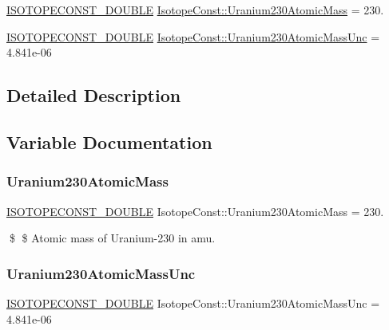 \begin{DoxyCompactItemize}
\item 
\mbox{\hyperlink{group___isotope_const-_macros_ga8f45a7272ce02c0b4c65c44636ed719a}{I\+S\+O\+T\+O\+P\+E\+C\+O\+N\+S\+T\+\_\+\+D\+O\+U\+B\+LE}} \mbox{\hyperlink{group___isotope_const-_uranium-_u230_gaa3982fd43164bf7d613f20e00440b876}{Isotope\+Const\+::\+Uranium230\+Atomic\+Mass}} = 230.
\item 
\mbox{\hyperlink{group___isotope_const-_macros_ga8f45a7272ce02c0b4c65c44636ed719a}{I\+S\+O\+T\+O\+P\+E\+C\+O\+N\+S\+T\+\_\+\+D\+O\+U\+B\+LE}} \mbox{\hyperlink{group___isotope_const-_uranium-_u230_ga62a482dda7a71f8e98fbc080d6f52c82}{Isotope\+Const\+::\+Uranium230\+Atomic\+Mass\+Unc}} = 4.\+841e-\/06
\end{DoxyCompactItemize}


\subsection{Detailed Description}


\subsection{Variable Documentation}
\mbox{\label{group___isotope_const-_uranium-_u230_gaa3982fd43164bf7d613f20e00440b876}} 
\subsubsection{\texorpdfstring{Uranium230\+Atomic\+Mass}{Uranium230AtomicMass}}
{\footnotesize\ttfamily \mbox{\hyperlink{group___isotope_const-_macros_ga8f45a7272ce02c0b4c65c44636ed719a}{I\+S\+O\+T\+O\+P\+E\+C\+O\+N\+S\+T\+\_\+\+D\+O\+U\+B\+LE}} Isotope\+Const\+::\+Uranium230\+Atomic\+Mass = 230.}

\$ \$ Atomic mass of Uranium-\/230 in amu. \mbox{\label{group___isotope_const-_uranium-_u230_ga62a482dda7a71f8e98fbc080d6f52c82}} 
\subsubsection{\texorpdfstring{Uranium230\+Atomic\+Mass\+Unc}{Uranium230AtomicMassUnc}}
{\footnotesize\ttfamily \mbox{\hyperlink{group___isotope_const-_macros_ga8f45a7272ce02c0b4c65c44636ed719a}{I\+S\+O\+T\+O\+P\+E\+C\+O\+N\+S\+T\+\_\+\+D\+O\+U\+B\+LE}} Isotope\+Const\+::\+Uranium230\+Atomic\+Mass\+Unc = 4.\+841e-\/06}


